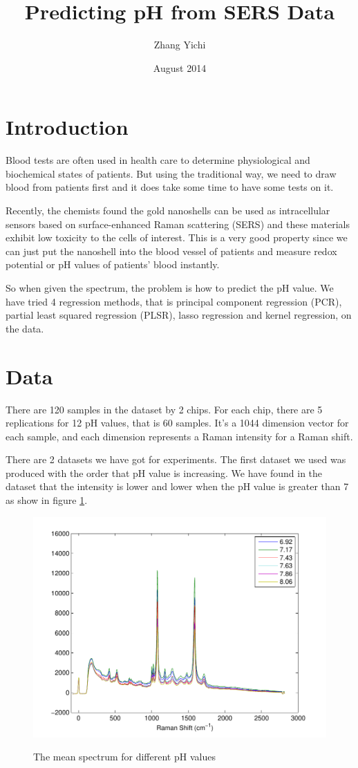 \documentclass[a4paper]{article}
\begin{document}
\title{\textbf{Predicting pH from SERS Data}}
\author{Zhang Yichi}
\date{August 2014}
\maketitle

\section{Introduction}
Blood tests are often used in health care to determine physiological and biochemical states of patients. But using the traditional way, we need to draw blood from patients first and it does take some time to have some tests on it. 

Recently, the chemists found the gold nanoshells can be used as intracellular sensors based on surface-enhanced Raman scattering (SERS) and these materials exhibit low toxicity to the cells of interest. This is a very good property since we can just put the nanoshell into the blood vessel of patients and measure redox potential or pH values of patients' blood instantly.

So when given the spectrum, the problem is how to predict the pH value. We have tried 4 regression methods, that is principal component regression (PCR), partial least squared regression (PLSR), lasso regression and kernel regression, on the data.

\section{Data}
There are 120 samples in the dataset by 2 chips. For each chip, there are 5 replications for 12 pH values, that is 60 samples. It's a 1044 dimension vector for each sample, and each dimension represents a Raman intensity for a Raman shift.

There are 2 datasets we have got for experiments. The first dataset we used was produced with the order that pH value is increasing. We have found in the dataset that the intensity is lower and lower when the pH value is greater than 7 as show in figure \ref{pic1}.

\begin{figure}[h]
  \centering
  \includegraphics[width=.6\textwidth]{images/compare.pdf}\\
  \caption{The mean spectrum for different pH values}\label{pic1}
\end{figure}
\end{document}
